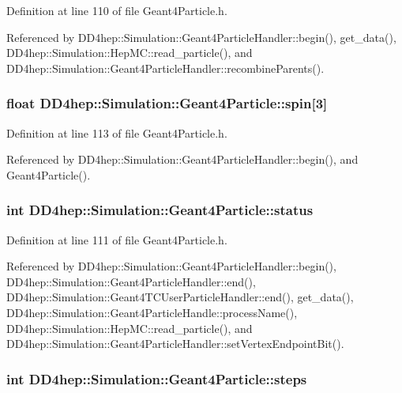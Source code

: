 Definition at line 110 of file Geant4Particle.h.

Referenced by DD4hep::Simulation::Geant4ParticleHandler::begin(), get\_\-data(), DD4hep::Simulation::HepMC::read\_\-particle(), and DD4hep::Simulation::Geant4ParticleHandler::recombineParents().\hypertarget{class_d_d4hep_1_1_simulation_1_1_geant4_particle_a643cb972021cf9fe80163bbcab1525ef}{
\subsubsection[{spin}]{\setlength{\rightskip}{0pt plus 5cm}float {\bf DD4hep::Simulation::Geant4Particle::spin}\mbox{[}3\mbox{]}}}
\label{class_d_d4hep_1_1_simulation_1_1_geant4_particle_a643cb972021cf9fe80163bbcab1525ef}


Definition at line 113 of file Geant4Particle.h.

Referenced by DD4hep::Simulation::Geant4ParticleHandler::begin(), and Geant4Particle().\hypertarget{class_d_d4hep_1_1_simulation_1_1_geant4_particle_af9637a505c345dfe4a16309aa80ba89d}{
\subsubsection[{status}]{\setlength{\rightskip}{0pt plus 5cm}int {\bf DD4hep::Simulation::Geant4Particle::status}}}
\label{class_d_d4hep_1_1_simulation_1_1_geant4_particle_af9637a505c345dfe4a16309aa80ba89d}


Definition at line 111 of file Geant4Particle.h.

Referenced by DD4hep::Simulation::Geant4ParticleHandler::begin(), DD4hep::Simulation::Geant4ParticleHandler::end(), DD4hep::Simulation::Geant4TCUserParticleHandler::end(), get\_\-data(), DD4hep::Simulation::Geant4ParticleHandle::processName(), DD4hep::Simulation::HepMC::read\_\-particle(), and DD4hep::Simulation::Geant4ParticleHandler::setVertexEndpointBit().\hypertarget{class_d_d4hep_1_1_simulation_1_1_geant4_particle_acb743ee2fab907c9734fdb2523132833}{
\subsubsection[{steps}]{\setlength{\rightskip}{0pt plus 5cm}int {\bf DD4hep::Simulation::Geant4Particle::steps}}}
\label{class_d_d4hep_1_1_simulation_1_1_geant4_particle_acb743ee2fab907c9734fdb2523132833}


